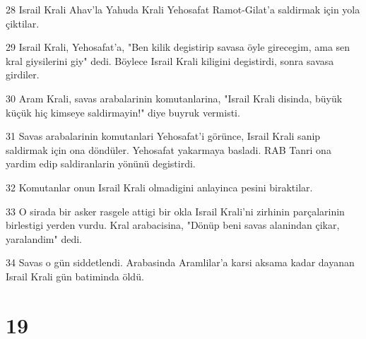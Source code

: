 \par 28 Israil Krali Ahav'la Yahuda Krali Yehosafat Ramot-Gilat'a saldirmak için yola çiktilar.
\par 29 Israil Krali, Yehosafat'a, "Ben kilik degistirip savasa öyle girecegim, ama sen kral giysilerini giy" dedi. Böylece Israil Krali kiligini degistirdi, sonra savasa girdiler.
\par 30 Aram Krali, savas arabalarinin komutanlarina, "Israil Krali disinda, büyük küçük hiç kimseye saldirmayin!" diye buyruk vermisti.
\par 31 Savas arabalarinin komutanlari Yehosafat'i görünce, Israil Krali sanip saldirmak için ona döndüler. Yehosafat yakarmaya basladi. RAB Tanri ona yardim edip saldiranlarin yönünü degistirdi.
\par 32 Komutanlar onun Israil Krali olmadigini anlayinca pesini biraktilar.
\par 33 O sirada bir asker rasgele attigi bir okla Israil Krali'ni zirhinin parçalarinin birlestigi yerden vurdu. Kral arabacisina, "Dönüp beni savas alanindan çikar, yaralandim" dedi.
\par 34 Savas o gün siddetlendi. Arabasinda Aramlilar'a karsi aksama kadar dayanan Israil Krali gün batiminda öldü.

\chapter{19}

